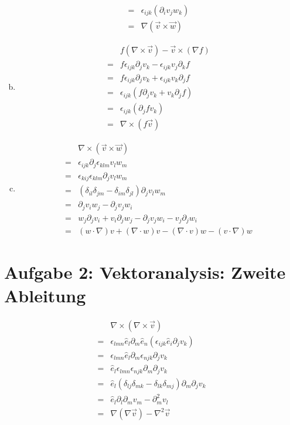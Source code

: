 \documentclass[a4paper,german,12pt,smallheadings]{scrartcl}
\begin{document}
\begin{enumerate}[a)]
\begin{align}
      =  &\epsilon_{ijk} (\partial_i v_j w_k) \\
      =  &\nabla (\vec{v} \times \vec{w})
    \end{align}
  \item
    \begin{align}
      &f(\nabla \times \vec{v}) - \vec{v} \times (\nabla f) \\
      = &f \epsilon_{ijk} \partial_j v_k - \epsilon_{ijk} v_j \partial_k f \\
      = &f \epsilon_{ijk} \partial_j v_k + \epsilon_{ijk} v_k \partial_j f \\
      = &\epsilon_{ijk} (f \partial_j v_k + v_k \partial_j f) \\
      = &\epsilon_{ijk} (\partial_j f v_k) \\
      = &\nabla \times (f \vec{v})
    \end{align}
  \item
    \begin{align}
      &\nabla \times (\vec{v} \times \vec{w}) \\
      = &\epsilon_{ijk} \partial_j \epsilon_{klm} v_l w_m \\
      = &\epsilon_{kij} \epsilon_{klm} \partial_j v_l w_m \\
      = &(\delta_{il} \delta_{jm} - \delta_{im} \delta_{jl}) \partial_j v_l w_m \\
      = &\partial_j v_i w_j - \partial_j v_j w_i \\
      = &w_j \partial_j v_i + v_i \partial_j w_j - \partial_j v_j w_i - v_j \partial_j w_i \\
      = &(w \cdot \nabla) v + (\nabla \cdot w) v - (\nabla \cdot v) w - (v \cdot \nabla) w
    \end{align}
\end{enumerate}

\section*{Aufgabe 2: Vektoranalysis: Zweite Ableitung}

\begin{align}
  &\nabla \times (\nabla \times \vec{v}) \\
  = &\epsilon_{lmn} \hat{e}_l \partial_m \hat{e}_n (\epsilon_{ijk} \hat{e}_i \partial_j v_k) \\
  = &\epsilon_{lmn} \hat{e}_l \partial_m \epsilon_{njk} \partial_j v_k \\
  = &\hat{e}_l \epsilon_{lmn} \epsilon_{njk} \partial_m \partial_j v_k \\
  = &\hat{e}_l (\delta_{lj}\delta_{mk} - \delta_{lk}\delta_{mj}) \partial_m \partial_j v_k \\
  = &\hat{e}_l \partial_l \partial_m v_m - \partial_m^2 v_l \\
  = &\nabla(\nabla \vec{v}) - \nabla^2 \vec{v}
\end{align}
\end{document}
